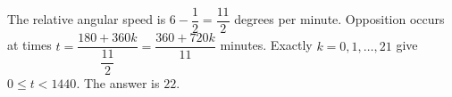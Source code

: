 The relative angular speed is $6-\dfrac{1}{2}=\dfrac{11}{2}$ degrees per minute. Opposition occurs at times $t=\dfrac{180+360k}{\dfrac{11}{2}}=\dfrac{360+720k}{11}$ minutes. Exactly $k=0,1,\ldots,21$ give $0\le t<1440$. The answer is $\boxed{22}$.
